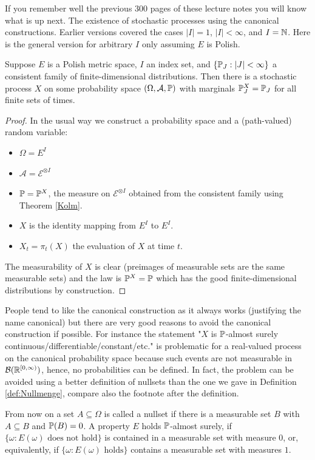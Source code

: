 If you remember well the previous 300 pages of these lecture notes you will know what is up next. The existence of stochastic processes using the canonical constructions. Earlier versions covered the cases $|I|=1$, $|I|<\infty$, and $I=\N$. Here is the general version for arbitrary $I$ only assuming $E$ is Polish.
\begin{lsuperwichtigersatzExistence}
	\begin{theorem}\label{KolmogorovProcess}
		Suppose $E$ is a Polish metric space, $I$ an index set, and $\{\P_J:|J|<\infty\}$ a consistent family of finite-dimensional distributions. Then there is a stochastic process $X$ on some probability space $(\Omega, \mathcal A, \P)$ with marginals $\P_J^X=\P_J$ for all finite sets of times.
	\end{theorem}
\end{lsuperwichtigersatzExistence}
\begin{proof}[Proof]
	In the usual way we construct a probability space and a (path-valued) random variable:
	\begin{itemize}
		\item $\Omega=E^I$
		\item $\mathcal A=\mathcal E^{\otimes I}$
		\item $\P=\P^X$, the measure on $\mathcal E^{\otimes I}$ obtained from the consistent family using Theorem \ref{Kolm}.
		\item $X$ is the identity mapping from $E^I$ to $E^I$.
		\item $X_t=\pi_t(X)$ the evaluation of $X$ at time $t$.
	\end{itemize}
	The measurability of $X$ is clear (preimages of measurable sets are the same measurable sets) and the law is $\P^X=\P$ which has the good finite-dimensional distributions by construction.
\end{proof}
People tend to like the canonical construction as it always works (justifying the name canonical) but there are very good reasons to avoid the canonical construction if possible. For instance the statement "{}$X$ is $\P$-almost surely continuous/differentiable/constant/etc."{} is problematic for a real-valued process on the canonical probability space because such events are not measurable in $\mathcal B(\R^{[0,\infty)})$, hence, no probabilities can be defined. In fact, the problem can be avoided using a better definition of nullsets than the one we gave in Definition \ref{def:Nullmenge}, compare also the footnote after the definition.
\begin{lWarnhinweis}
	From now on a set $A\subseteq\Omega$ is called a nullset if there is a measurable set $B$ with $A\subseteq B$ and $\P(B)=0$. A property $E$ holds $\P$-almost surely, if $\{\omega: E(\omega) \text{ does not hold}\}$ is contained in a measurable set with measure $0$, or, equivalently, if $\{\omega: E(\omega) \text{ holds}\}$ contains a measurable set with measures $1$.
\end{lWarnhinweis}
